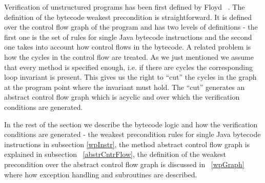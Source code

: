 Verification of unstructured programs has been first defined by Floyd ~\cite{F67amp}. The definition of the bytecode weakest 
precondition is straightforward.  It is defined over the control flow graph of the program and has two levels of definitions - 
 the first one is the set of rules for single Java bytecode instructions and the second one takes into account how control
 flows in the bytecode. A related problem is how the cycles in the control flow are treated. 
As we just mentioned we assume that every method is specified enough, i.e. if there are cycles the corresponding 
loop invariant is present. This gives us the right to ``cut'' the cycles in the graph at the program point where the invariant must hold. 
The ``cut'' generates an abstract control flow graph which is acyclic and over which the verification conditions are generated.  

In the rest of the section we describe the bytecode logic  and how the verification conditions are generated -
 the weakest precondition rules for single Java bytecode instructions in subsection \ref{wpInstr}, 
 the method abstract control flow graph is explained in subsection ~\ref{abstrCntrFlow}, 
 the definition of the weakest precondition over the abstract control flow graph is discussed in ~\ref{wpGraph} where how exception handling and subroutines
are described.












